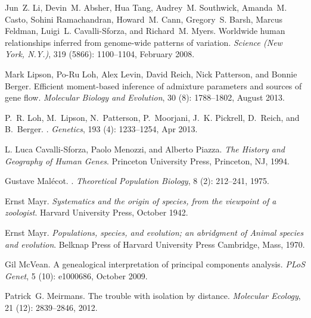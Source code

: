 \documentclass[10pt,letterpaper]{article}
\begin{document}
\begin{thebibliography}{80}
Jun~Z. Li, Devin~M. Absher, Hua Tang, Audrey~M. Southwick, Amanda~M. Casto,
  Sohini Ramachandran, Howard~M. Cann, Gregory~S. Barsh, Marcus Feldman,
  Luigi~L. Cavalli-Sforza, and Richard~M. Myers.
\newblock Worldwide human relationships inferred from genome-wide patterns of
  variation.
\newblock \emph{Science (New York, N.Y.)}, 319 (5866):
  1100--1104, February 2008.

Mark Lipson, Po-Ru Loh, Alex Levin, David Reich, Nick Patterson, and Bonnie
  Berger.
\newblock Efficient moment-based inference of admixture parameters and sources
  of gene flow.
\newblock \emph{Molecular Biology and Evolution}, 30 (8):
  1788--1802, August 2013.

P.~R. Loh, M.~Lipson, N.~Patterson, P.~Moorjani, J.~K. Pickrell, D.~Reich, and
  B.~Berger.
.
\newblock \emph{Genetics}, 193 (4): 1233--1254, Apr 2013.

L. Luca Cavalli-Sforza, Paolo Menozzi, and Alberto Piazza.
\newblock \emph{The History and Geography of Human Genes}.
\newblock Princeton University Press, Princeton, NJ, 1994.

Gustave Mal\'{e}cot.
.
\newblock \emph{Theoretical Population Biology}, 8 (2):
  212--241, 1975.

Ernst Mayr.
\newblock \emph{{Systematics and the origin of species, from the viewpoint of a
  zoologist}}.
\newblock Harvard University Press, October 1942.

Ernst Mayr.
\newblock \emph{Populations, species, and evolution; an abridgment of Animal
  species and evolution}.
\newblock Belknap Press of Harvard University Press Cambridge, Mass, 1970.

Gil McVean.
\newblock A genealogical interpretation of principal components analysis.
\newblock \emph{{PLoS} Genet}, 5 (10): e1000686, October
  2009.

Patrick~G. Meirmans.
\newblock The trouble with isolation by distance.
\newblock \emph{Molecular Ecology}, 21 (12): 2839--2846,
  2012.


\end{thebibliography}
\end{document}

